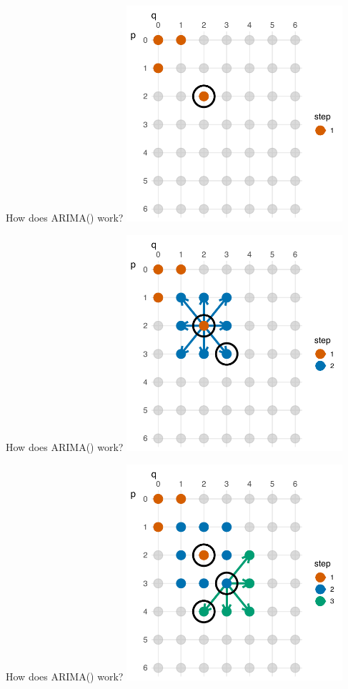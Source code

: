 \documentclass[
  14pt,
  ignorenonframetext,
  aspectratio=169,
]{beamer}
\begin{document}
\begin{frame}{How does ARIMA() work?}
\protect\hypertarget{how-does-arima-work-2}{}
\includegraphics[width=0.6\textwidth,height=\textheight]{04_arima_files/figure-beamer/ARMAgridsearch-1.pdf}
\end{frame}

\begin{frame}{How does ARIMA() work?}
\protect\hypertarget{how-does-arima-work-3}{}
\includegraphics[width=0.6\textwidth,height=\textheight]{04_arima_files/figure-beamer/ARMAgridsearch2-1.pdf}
\end{frame}

\begin{frame}{How does ARIMA() work?}
\protect\hypertarget{how-does-arima-work-4}{}
\includegraphics[width=0.6\textwidth,height=\textheight]{04_arima_files/figure-beamer/ARMAgridsearch3-1.pdf}
\end{frame}
\end{document}
